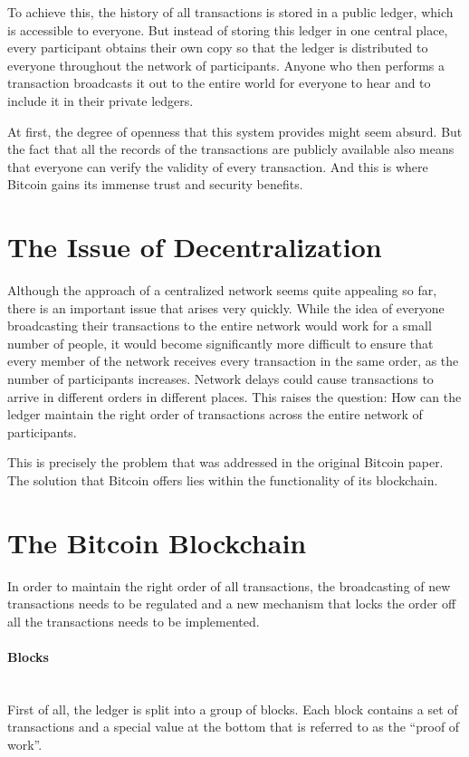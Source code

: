 \documentclass[a4paper, 12pt]{report}
\begin{document}
\par To achieve this, the history of all transactions is stored in a public ledger, which is accessible to everyone. But instead of storing this ledger in one central place, every participant obtains their own copy so that the ledger is distributed to everyone throughout the network of participants. Anyone who then performs a transaction broadcasts it out to the entire world for everyone to hear and to include it in their private ledgers. 
\par At first, the degree of openness that this system provides might seem absurd. But the fact that all the records of the transactions are publicly available also means that everyone can verify the validity of every transaction. And this is where Bitcoin gains its immense trust and security benefits.

\section{The Issue of Decentralization}
\par Although the approach of a centralized network seems quite appealing so far, there is an important issue that arises very quickly. While the idea of everyone broadcasting their transactions to the entire network would work for a small number of people, it would become significantly more difficult to ensure that every member of the network receives every transaction in the same order, as the number of participants increases. Network delays could cause transactions to arrive in different orders in different places. This raises the question: How can the ledger maintain the right order of transactions across the entire network of participants. 
\par This is precisely the problem that was addressed in the original Bitcoin paper. The solution that Bitcoin offers lies within the functionality of its blockchain.

\section{The Bitcoin Blockchain}
\par In order to maintain the right order of all transactions, the broadcasting of new transactions needs to be regulated and a new mechanism that locks the order off all the transactions needs to be implemented.
\paragraph{Blocks} \hspace{0pt} \\
First of all, the ledger is split into a group of blocks. Each block contains a set of transactions and a special value at the bottom that is referred to as the “proof of work”. 
\end{document}

